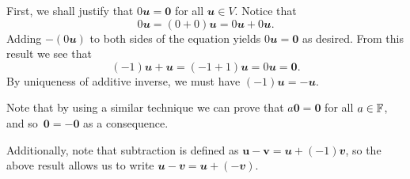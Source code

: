\documentclass[math]{amznotes}
\theoremstyle{remark}
\newcommand{\zero}{\mathbf{0}}
\begin{document}
First, we shall justify that $0\mathbfit{u} = \zero$ for all $\mathbfit{u} \in V$. Notice that
\begin{equation*}
    0\mathbfit{u} = (0 + 0)\mathbfit{u} = 0\mathbfit{u} + 0\mathbfit{u}.
\end{equation*}
Adding $-(0\mathbfit{u})$ to both sides of the equation yields $0\mathbfit{u} = \zero$ as desired. From this result we see that
\begin{equation*}
    (-1)\mathbfit{u} + \mathbfit{u} = (-1 + 1)\mathbfit{u} = 0\mathbfit{u} = \zero.
\end{equation*}
By uniqueness of additive inverse, we must have $(-1)\mathbfit{u} = -\mathbfit{u}$.

Note that by using a similar technique we can prove that $a\zero = \zero$ for all $a \in \mathbb{F}$, and so~$\zero = -\zero$ as a consequence.

Additionally, note that subtraction is defined as $\mathbf{u - v} = \mathbfit{u} + (-1)\mathbfit{v}$, so the above result allows us to write $\mathbfit{u - v} = \mathbfit{u} + (-\mathbfit{v})$.
\end{document}
